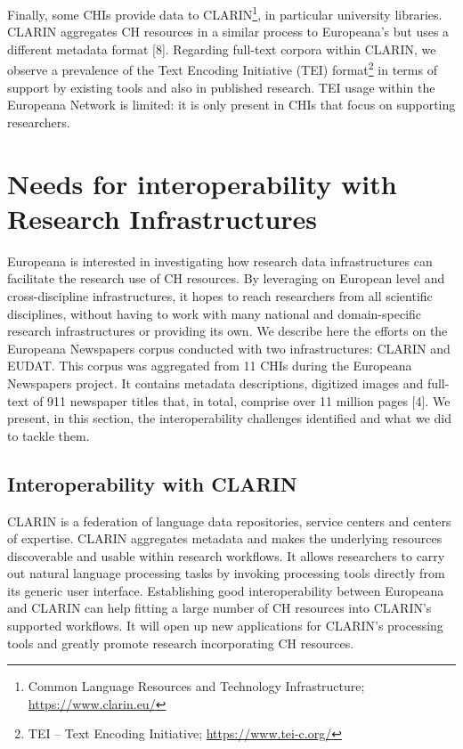 \documentclass[a4paper,UKenglish,cleveref, autoref]{oasics-v2019}
\begin{document}
Finally, some CHIs provide data to 
CLARIN\footnote{Common Language Resources and Technology Infrastructure; \url{https://www.clarin.eu/}},
in particular university libraries. CLARIN aggregates CH resources in a similar process to Europeana's but uses a different metadata format [8]. Regarding full-text corpora within CLARIN, we observe a prevalence of the Text Encoding Initiative (TEI)
format\footnote{TEI -- Text Encoding Initiative; \url{https://www.tei-c.org/}}
in terms of support by existing tools and also in published research. TEI usage within the Europeana Network is limited: it is only present in CHIs that focus on supporting researchers. 

\section{Needs for interoperability with Research Infrastructures}
\label{sec:needsforinteroperability}
Europeana is interested in investigating how research data infrastructures can facilitate the research use of CH resources. By leveraging on European level and cross-discipline infrastructures, it hopes to reach researchers from all scientific disciplines, without having to work with many national and domain-specific research infrastructures or providing its own. We describe here the efforts on the Europeana Newspapers corpus conducted with two infrastructures: CLARIN and EUDAT. This corpus was aggregated from 11 CHIs during the Europeana Newspapers project. It contains metadata descriptions, digitized images and full-text of 911 newspaper titles that, in total, comprise over 11 million pages [4]. We present, in this section, the interoperability challenges identified and what we did to tackle them. 

\subsection{Interoperability with CLARIN}
\label{sec:interoperabilitywithclarin}
CLARIN is a federation of language data repositories, service centers and centers of expertise. CLARIN aggregates metadata and makes the underlying resources discoverable and usable within research workflows. It allows researchers to carry out natural language processing tasks by invoking processing tools directly from its generic user interface. Establishing good interoperability between Europeana and CLARIN can help fitting a large number of CH resources into CLARIN's supported workflows. It will open up new applications for CLARIN's processing tools and greatly promote research incorporating CH resources.
\end{document}
